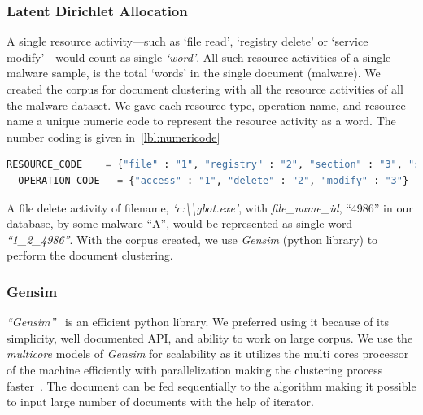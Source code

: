 \subsubsection{Latent Dirichlet Allocation}
\label{ssub:Latent Dirichlet Allocation}
A single resource activity---such as `file read', `registry delete' or `service modify'---would count as single \emph{`word'}.
All such resource activities of a single malware sample, is the total `words' in the single document (malware).
We created the corpus for document clustering with all the resource activities of all the malware dataset.
We gave each resource type, operation name, and resource name a unique numeric code to represent the resource activity as a word.
The number coding is given in~\autoref{lbl:numericode}
\begin{lstlisting}[numbers=none,language=python,caption={Numeric codes given to resource and operation},label={lbl:numericode}]
  RESOURCE_CODE    = {"file" : "1", "registry" : "2", "section" : "3", "service" : "4", "driver" : "5", "sync" : "6", "process" : "7", "job" : "8"}
  OPERATION_CODE   = {"access" : "1", "delete" : "2", "modify" : "3"}
\end{lstlisting}

A file delete activity of filename, \textit{`c:\textbackslash\textbackslash{}gbot.exe'}, with \textit{file\_name\_id}, ``4986'' in our database, by some malware ``A'', would be represented as single word \emph{``1\_2\_4986''}.
With the corpus created, we use \emph{Gensim} (python library) to perform the document clustering.
\subsubsection{Gensim}
\label{ssub:Gensim}
\emph{``Gensim''}~\cite[]{gensim} is an efficient python library.
We preferred using it because of its simplicity, well documented API, and ability to work on large corpus.
We use the \emph{multicore} models of \emph{Gensim} for scalability as it utilizes the multi cores processor of the machine efficiently with parallelization making the clustering process faster~\cite[]{ldamulticore}.
The document can be fed sequentially to the algorithm making it possible to input large number of documents with the help of iterator.

